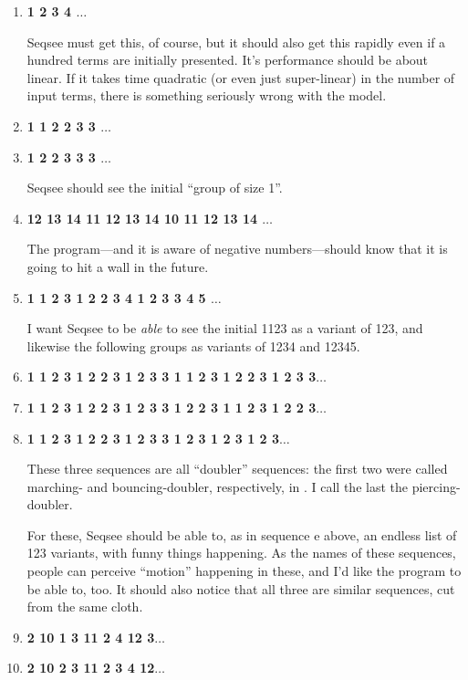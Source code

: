 \documentclass{article}
\begin{document}
\renewcommand{\theenumi}{\alph{enumi}}
\begin{enumerate}
\item \textbf{1 2 3 4 $\ldots$}

Seqsee must get this, of course, but it should also get this rapidly even if a hundred terms are initially presented. It's performance should be about linear. If it takes time quadratic (or even just super-linear) in the number of input terms, there is something seriously wrong with the model.

\item \textbf{ 1 1 2 2 3 3 $\ldots$}
\item \textbf{ 1 2 2 3 3 3 $\ldots$}

Seqsee should see the initial ``group of size 1''.

\item \textbf{12 13 14 11 12 13 14 10 11 12 13 14 $\ldots$}

The program---and it is aware of negative numbers---should know that it is going to hit a wall in the future.

\item \textbf{1 1 2 3 1 2 2 3 4 1 2 3 3 4 5 $\ldots$}

I want Seqsee to be \emph{able} to see the initial 1123 as a variant of 123, and likewise the following groups as variants of 1234 and 12345.

\item \textbf{1 1 2 3 1 2 2 3 1 2 3 3 1 1 2 3 1 2 2 3 1 2 3 3$\ldots$}
\item \textbf{1 1 2 3 1 2 2 3 1 2 3 3 1 2 2 3 1 1 2 3 1 2 2 3$\ldots$}
\item \textbf{1 1 2 3 1 2 2 3 1 2 3 3 1 2 3 1 2 3 1 2 3$\ldots$}

These three sequences are all ``doubler'' sequences: the first two were called marching- and bouncing-doubler, respectively, in \cite{Hofstadter:FCCA}. I call the last the piercing-doubler.

For these, Seqsee should be able to, as in sequence e above, an endless list of 123 variants, with funny things happening. As the names of these sequences, people can perceive ``motion'' happening in these, and I'd like the program to be able to, too. It should also notice that all three are similar sequences, cut from the same cloth.

\item \textbf{ 2 10 1 3 11 2 4 12 3$\ldots$}
\item \textbf{ 2 10 2 3 11 2 3 4 12$\ldots$}


\end{enumerate}
\end{document}
